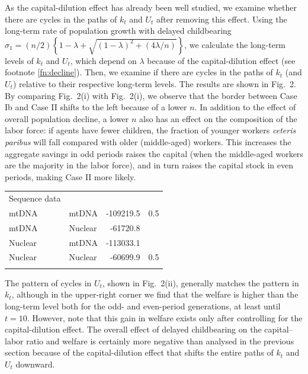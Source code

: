 \documentclass[nogrid]{MBE}%
\begin{document}
{\enlargethispage{2pt}

As the capital-dilution effect has already been well studied, we examine whether there are cycles
in the paths of $k_{t}$ and $U_{t}$ after removing this effect. {Using the \hbox{long-term} rate
of population growth with delayed childbearing $\sigma_{1}=(n/2)\left\{  1-\lambda+
\sqrt{(1-\lambda )^{2}+(4\lambda/n)}\right\}  $, we calculate the long-term levels of $k_{t}$ and
$U_{t}$, which depend on $\lambda$ because of the capital-dilution effect (see footnote
\ref{fn:decline}). Then, we examine if there are cycles in the paths of $k_{t}$ (and $U_{t}$)
relative to their respective long-term levels.} The results are shown in Fig.~2. By comparing
Fig.~2(i) with Fig.~2(i), we observe that the border between Case Ib and Case II shifts to the
left because of a lower $n$. In addition to the effect of overall population decline, a lower $n$
also has an effect on the composition of the labor force: if agents have fewer children, the
fraction of younger workers \textit{ceteris paribus} will fall compared with older (middle-aged)
workers. This increases the aggregate savings in odd periods raises the capital (when the
middle-aged workers are the majority in the labor force), and in turn raises the capital stock in
even periods, making Case II more likely.

\begin{table}[!t]%
{\begin{tabular*}{\columnwidth}{@{\extracolsep{\fill}}lld{6,0}d{6,0}@{}}\toprule Sequence data &
 &  &  \\\colrule mtDNA& mtDNA& -109219.5& 0.5 \\
[0.1pt]
mtDNA& Nuclear& -61720.8&  \\
Nuclear& mtDNA& -113033.1&  \\
Nuclear& Nuclear& -60699.9& 0.5 \\\botrule
\end{tabular*}}
{}
\end{table}

The pattern of cycles in $U_{t}$, shown in Fig.~2(ii), generally matches the pattern in $k_{t}$,
although in the upper-right corner we find that the welfare is higher than the long-term level
both for the odd- and even-period generations, at least until $t=10$. However, note that this gain
in welfare exists only after controlling for the capital-dilution effect. The overall effect of
delayed childbearing on the capital--labor ratio and welfare is certainly more negative than
analysed in the previous section because of the capital-dilution effect that shifts the entire
paths of $k_{t}$ and $U_{t}$ downward.

}
\end{document}
